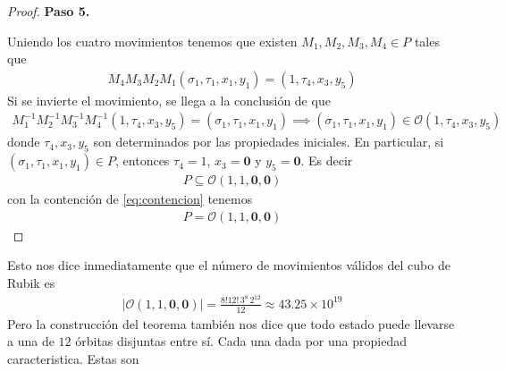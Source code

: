 \documentclass{article}
\theoremstyle{definition}
\begin{document}
\begin{proof}
    \noindent\textbf{Paso 5.}
    
    Uniendo los cuatro movimientos tenemos que existen $M_1,M_2,M_3,M_4\in P$ tales que
    \begin{align*}
        M_4M_3M_2M_1(\sigma_1,\tau_1,x_1,y_1)=(1,\tau_4,x_3,y_5)
    \end{align*}
    Si se invierte el movimiento, se llega a la conclusión de que
    \begin{align*}
        M_1^{-1}M_2^{-1}M_3^{-1}M_4^{-1}(1,\tau_4,x_3,y_5)=(\sigma_1,\tau_1,x_1,y_1)\implies (\sigma_1,\tau_1,x_1,y_1)\in \mathcal{O}(1,\tau_4,x_3,y_5)
    \end{align*}
    donde $\tau_4,x_3,y_5$ son determinados por las propiedades iniciales. En particular, si $(\sigma_1,\tau_1,x_1,y_1)\in P$, entonces $\tau_4=1$, $x_3=\mathbf{0}$ y $y_5=\mathbf{0}$.
    Es decir
    \begin{align*}
        P\subseteq\mathcal{O}(1,1,\mathbf{0},\mathbf{0})
    \end{align*}
    con la contención de \eqref{eq:contencion} tenemos
    \begin{align*}
        P=\mathcal{O}(1,1,\mathbf{0},\mathbf{0})
    \end{align*}
\end{proof}
Esto nos dice inmediatamente que el número de movimientos válidos del cubo de Rubik es
\begin{align*}
    |\mathcal{O}(1,1,\mathbf{0},\mathbf{0})|=\frac{8!12!\,3^{8}\,2^{12}}{12}\approx 43.25\times 10^{19}
\end{align*}
Pero la construcción del teorema también nos dice que todo estado puede llevarse a una de $12$ órbitas disjuntas entre sí. Cada una dada por una propiedad caracteristica. Estas son
\end{document}
